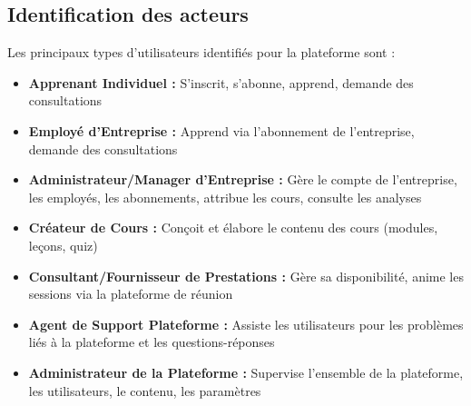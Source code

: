 \subsection{Identification des acteurs}
Les principaux types d'utilisateurs identifiés pour la plateforme sont :
\begin{itemize}
  \item \textbf{Apprenant Individuel :} S'inscrit, s'abonne, apprend, demande des consultations
  \item \textbf{Employé d'Entreprise :} Apprend via l'abonnement de l'entreprise, demande des consultations
  \item \textbf{Administrateur/Manager d'Entreprise :} Gère le compte de l'entreprise, les employés, les abonnements, attribue les cours, consulte les analyses
  \item \textbf{Créateur de Cours :} Conçoit et élabore le contenu des cours (modules, leçons, quiz)
  \item \textbf{Consultant/Fournisseur de Prestations :} Gère sa disponibilité, anime les sessions via la plateforme de réunion
  \item \textbf{Agent de Support Plateforme :} Assiste les utilisateurs pour les problèmes liés à la plateforme et les questions-réponses
  \item \textbf{Administrateur de la Plateforme :} Supervise l'ensemble de la plateforme, les utilisateurs, le contenu, les paramètres
\end{itemize}

